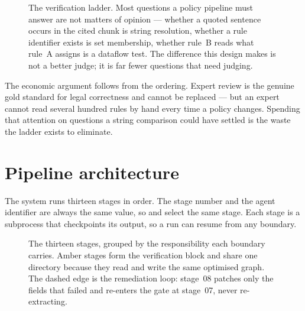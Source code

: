 \documentclass[11pt]{article}
\begin{document}
\begin{figure}[htbp]
  \centering
  \resizebox{\linewidth}{!}{}
  \caption{The verification ladder. Most questions a policy pipeline must
    answer are not matters of opinion --- whether a quoted sentence occurs
    in the cited chunk is string resolution, whether a rule identifier
    exists is set membership, whether rule~B reads what rule~A assigns is a
    dataflow test. The difference this design makes is not a better judge;
    it is far fewer questions that need judging.}
  \label{fig:ladder}
\end{figure}

The economic argument follows from the ordering. Expert review is the
genuine gold standard for legal correctness and cannot be replaced --- but
an expert cannot read several hundred rules by hand every time a policy
changes. Spending that attention on questions a string comparison could
have settled is the waste the ladder exists to eliminate.

\section{Pipeline architecture}

The system runs thirteen stages in order. The stage number and the agent
identifier are always the same value, so  and
 select the same stage. Each stage is a
subprocess that checkpoints its output, so a run can resume from any
boundary.

\begin{figure}[htbp]
  \centering
  \resizebox{\linewidth}{!}{}
  \caption{The thirteen stages, grouped by the responsibility each boundary
    carries. Amber stages form the verification block and share one
    directory because they read and write the same optimised graph. The
    dashed edge is the remediation loop: stage~08 patches only the fields
    that failed and re-enters the gate at stage~07, never re-extracting.}
  \label{fig:pipeline}
\end{figure}
\end{document}
